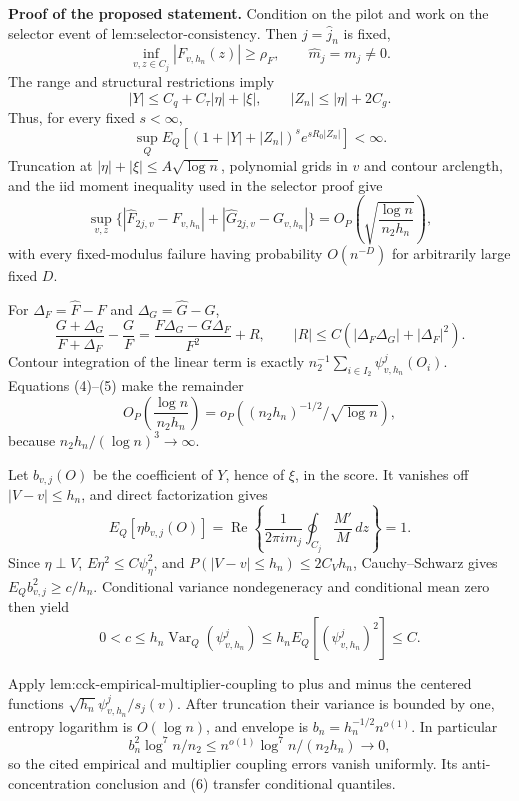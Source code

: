 \textbf{Proof of the proposed statement.}
Condition on the pilot and work on the selector event of \(\text{lem:selector-consistency}\). Then \(j=\widehat j_n\) is fixed,
\[
 \inf_{v,z\in C_j}|F_{v,h_n}(z)|\ge\rho_F,
 \qquad \widehat m_j=m_j\ne0. \tag{1}
\]
The range and structural restrictions imply
\[
 |Y|\le C_q+C_\tau|\eta|+|\xi|,\qquad |Z_n|\le|\eta|+2C_g. \tag{2}
\]
Thus, for every fixed \(s<\infty\),
\[
 \sup_QE_Q[(1+|Y|+|Z_n|)^se^{sR_0|Z_n|}]<\infty. \tag{3}
\]
Truncation at \(|\eta|+|\xi|\le A\sqrt{\log n}\), polynomial grids in \(v\) and contour arclength, and the iid moment inequality used in the selector proof give
\[
 \sup_{v,z}\{|\widehat F_{2j,v}-F_{v,h_n}|+|\widehat G_{2j,v}-G_{v,h_n}|\}
 =O_P\left(\sqrt{\frac{\log n}{n_2h_n}}\right), \tag{4}
\]
with every fixed-modulus failure having probability \(O(n^{-D})\) for arbitrarily large fixed \(D\).

For \(\Delta_F=\widehat F-F\) and \(\Delta_G=\widehat G-G\),
\[
 \frac{G+\Delta_G}{F+\Delta_F}-\frac GF
 =\frac{F\Delta_G-G\Delta_F}{F^2}+R,
 \qquad |R|\le C(|\Delta_F\Delta_G|+|\Delta_F|^2). \tag{5}
\]
Contour integration of the linear term is exactly \(n_2^{-1}\sum_{i\in I_2}\psi^j_{v,h_n}(O_i)\). Equations (4)--(5) make the remainder
\[
 O_P\left(\frac{\log n}{n_2h_n}\right)
 =o_P\left((n_2h_n)^{-1/2}/\sqrt{\log n}\right), \tag{6}
\]
because \(n_2h_n/(\log n)^3\to\infty\).

Let \(b_{v,j}(O)\) be the coefficient of \(Y\), hence of \(\xi\), in the score. It vanishes off \(|V-v|\le h_n\), and direct factorization gives
\[
 E_Q[\eta b_{v,j}(O)]
 =\operatorname{Re}\left\{\frac1{2\pi i m_j}\oint_{C_j}\frac{M'}M\,dz\right\}=1. \tag{7}
\]
Since \(\eta\perp V\), \(E\eta^2\le C\psi_\eta^2\), and \(P(|V-v|\le h_n)\le2C_Vh_n\), Cauchy--Schwarz gives \(E_Qb_{v,j}^2\ge c/h_n\). Conditional variance nondegeneracy and conditional mean zero then yield
\[
 0<c\le h_n\operatorname{Var}_Q(\psi^j_{v,h_n})
 \le h_nE_Q[(\psi^j_{v,h_n})^2]\le C. \tag{8}
\]

Apply \(\text{lem:cck-empirical-multiplier-coupling}\) to plus and minus the centered functions \(\sqrt{h_n}\psi^j_{v,h_n}/s_j(v)\). After truncation their variance is bounded by one, entropy logarithm is \(O(\log n)\), and envelope is \(b_n=h_n^{-1/2}n^{o(1)}\). In particular
\[
 b_n^2\log^7n/n_2\le n^{o(1)}\log^7n/(n_2h_n)\to0, \tag{9}
\]
so the cited empirical and multiplier coupling errors vanish uniformly. Its anti-concentration conclusion and (6) transfer conditional quantiles.

